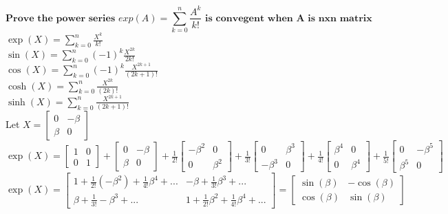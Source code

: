\documentclass[10pt]{article}
\begin{document}
\[ \textbf{Prove the power series } exp(A) = \sum_{k=0}^{n} \frac{A^{k}}{k!} \textbf{ is convegent when A is nxn matrix} \]
$\exp(X) = \sum_{k=0}^{n} \frac{X^{k}}{k!}$\\
$\sin(X) = \sum_{k=0}^{n} (-1)^{k}\frac{X^{2k}}{2k!}$\\
$\cos(X) = \sum_{k=0}^{n} (-1)^{k}\frac{X^{2k+1}}{(2k+1)!}$\\
$\cosh(X) = \sum_{k=0}^{n} \frac{X^{2k}}{(2k)!}$\\
$\sinh(X) = \sum_{k=0}^{n} \frac{X^{2k+1}}{(2k+1)!}$\\

Let $ X = 
    \begin{bmatrix}
    0 & -\beta \\
    \beta & 0 
    \end{bmatrix}
$\\

$
    \exp(X) = 
        \begin{bmatrix}
        1 & 0 \\
        0 & 1 
        \end{bmatrix}
        +
        \begin{bmatrix}
        0 & -\beta \\
        \beta & 0 
        \end{bmatrix}
        +
        \frac{1}{2!}
        \begin{bmatrix}
        -\beta^{2} & 0 \\
        0 & \beta^{2} 
        \end{bmatrix}
        +
        \frac{1}{3!}
        \begin{bmatrix}
        0 & \beta^{3} \\
        -\beta^{3} & 0 
        \end{bmatrix}
        +
        \frac{1}{4!}
        \begin{bmatrix}
        \beta^{4} & 0 \\
         0 & \beta^{4} 
        \end{bmatrix}
        +
        \frac{1}{5!}
        \begin{bmatrix}
        0 & -\beta^{5}\\
        \beta^{5} & 0 
        \end{bmatrix}
$\\
$
    \exp(X) = 
        \begin{bmatrix}
        1 + \frac{1}{2!}(-\beta^{2}) + \frac{1}{4!}\beta^{4} + ... & -\beta + \frac{1}{3!}\beta^{3} + ...\\
        \beta + \frac{1}{3!}-\beta^{3} + ... & 1 + \frac{1}{2!}\beta^{2} + \frac{1}{4!}\beta^{4} + ...
        \end{bmatrix}
        = 
        \begin{bmatrix}
        \sin(\beta) & -\cos(\beta)\\
        \cos(\beta) & \sin(\beta)
        \end{bmatrix}
$
\end{document}
